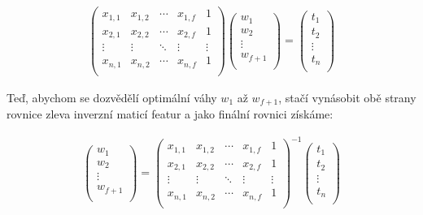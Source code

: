 \documentclass{../../../../ksp}
\begin{document}
\begin{gather*}
    \begin{pmatrix}
        x_{1,1} & x_{1,2} & \cdots & x_{1,f} & 1\\
        x_{2,1} & x_{2,2} & \cdots & x_{2,f} & 1\\
        \vdots & \vdots & \ddots & \vdots & \vdots\\
        x_{n,1} & x_{n,2} & \cdots & x_{n,f} & 1\\
    \end{pmatrix}
    \begin{pmatrix}
        w_{1}\\
        w_{2}\\
        \vdots\\
        w_{f+1}\\
    \end{pmatrix}
    =
    \begin{pmatrix}
        t_{1}\\
        t_{2}\\
        \vdots\\
        t_{n}\\
    \end{pmatrix}
\end{gather*}

Teď, abychom se dozvědělí optimální váhy $w_1$ až $w_{f+1}$, stačí vynásobit obě strany rovnice zleva
inverzní maticí featur a jako finální rovnici získáme:

\begin{gather*}
    \begin{pmatrix}
        w_{1}\\
        w_{2}\\
        \vdots\\
        w_{f+1}\\
    \end{pmatrix}
    =
    \begin{pmatrix}
        x_{1,1} & x_{1,2} & \cdots & x_{1,f} & 1\\
        x_{2,1} & x_{2,2} & \cdots & x_{2,f} & 1\\
        \vdots & \vdots & \ddots & \vdots & \vdots\\
        x_{n,1} & x_{n,2} & \cdots & x_{n,f} & 1\\
    \end{pmatrix}
    ^{-1}
    \begin{pmatrix}
        t_{1}\\
        t_{2}\\
        \vdots\\
        t_{n}\\
    \end{pmatrix}
\end{gather*}
\end{document}
